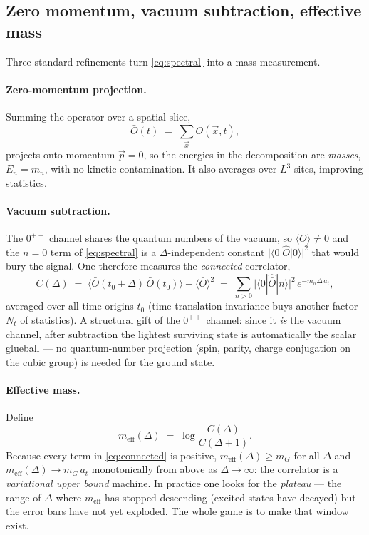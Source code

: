 \documentclass[11pt,a4paper]{article}
\newcommand{\Obar}{\bar{O}}
\newcommand{\meff}{m_{\mathrm{eff}}}
\newcommand{\at}{a_t}
\begin{document}
\subsection{Zero momentum, vacuum subtraction, effective mass}

Three standard refinements turn \eqref{eq:spectral} into a mass measurement.

\paragraph{Zero-momentum projection.} Summing the operator over a spatial
slice,
\begin{equation}
  \Obar(t) \;=\; \sum_{\vec x} O(\vec x, t),
\end{equation}
projects onto momentum $\vec p=0$, so the energies in the decomposition are
\emph{masses}, $E_n = m_n$, with no kinetic contamination. It also averages
over $L^3$ sites, improving statistics.

\paragraph{Vacuum subtraction.} The $0^{++}$ channel shares the quantum
numbers of the vacuum, so $\langle\Obar\rangle\neq0$ and the $n=0$ term of
\eqref{eq:spectral} is a $\Delta$-independent constant
$|\langle0|\hat O|0\rangle|^2$ that would bury the signal. One therefore
measures the \emph{connected} correlator,
\begin{equation}
  C(\Delta)
  \;=\;
  \big\langle \Obar(t_0{+}\Delta)\,\Obar(t_0) \big\rangle
  - \big\langle \Obar \big\rangle^2
  \;=\;
  \sum_{n>0} \big|\langle 0|\hat{\bar O}|n\rangle\big|^2\, e^{-m_n \Delta\,\at},
  \label{eq:connected}
\end{equation}
averaged over all time origins $t_0$ (time-translation invariance buys another
factor $N_t$ of statistics). A structural gift of the $0^{++}$ channel: since
it \emph{is} the vacuum channel, after subtraction the lightest surviving
state is automatically the scalar glueball --- no quantum-number projection
(spin, parity, charge conjugation on the cubic group) is needed for the
ground state.

\paragraph{Effective mass.} Define
\begin{equation}
  \meff(\Delta) \;=\; \log\frac{C(\Delta)}{C(\Delta+1)} .
  \label{eq:meff}
\end{equation}
Because every term in \eqref{eq:connected} is positive,
$\meff(\Delta)\ge m_G$ for all $\Delta$ and $\meff(\Delta)\to m_G\,\at$
monotonically from above as $\Delta\to\infty$: the correlator is a
\emph{variational upper bound} machine. In practice one looks for the
\emph{plateau} --- the range of $\Delta$ where $\meff$ has stopped descending
(excited states have decayed) but the error bars have not yet exploded. The
whole game is to make that window exist.
\end{document}
